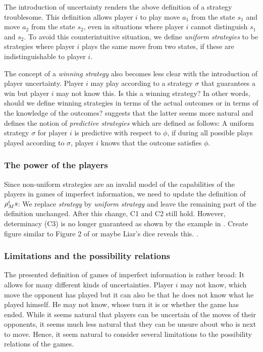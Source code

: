 The introduction of uncertainty renders the above definition of a strategy troublesome. This definition allows player $ i $ to play move $ a_{1} $ from the state $ s_{1} $ and move $ a_{2} $ from the state $ s_{2} $, even in situations where player $ i $ cannot distinguish $ s_{1} $ and $ s_{2} $. To avoid this counterintuitive situation, we define \emph{uniform strategies} to be strategies where player $ i $ plays the same move from two states, if these are indistinguishable to player $ i $.

The concept of a \emph{winning strategy} also becomes less clear with the introduction of player uncertainty. Player $ i $ may play according to a strategy $ \sigma $ that guarantees a win but player $ i $ may not know this. Is this a winning strategy? In other words, should we define winning strategies in terms of the actual outcomes or in terms of the knowledge of the outcomes? \cite{benthem2001a} suggests that the latter seems more natural and defines the notion of \emph{predictive strategies} which are defined as follows: A uniform strategy $ \sigma $ for player $ i $ is predictive with respect to $ \phi $, if during all possible plays played according to $ \sigma $, player $ i $ knows that the outcome satisfies $ \phi $.

\subsubsection*{The power of the players}

Since non-uniform strategies are an invalid model of the capabilities of the players in games of imperfect information, we need to update the definition of $ \rho_{M}^{ i } s $: We replace \emph{strategy} by \emph{uniform strategy} and leave the remaining part of the definition unchanged. After this change, C1 and C2 still hold. However, determinacy (C3) is no longer guaranteed as shown by the example in . { \color{red} Create figure similar to Figure 2 of \cite{benthem2001a} or maybe Liar's dice reveals this. }.

\subsubsection*{Limitations and the possibility relations}

The presented definition of games of imperfect information is rather broad: It allows for many different kinds of uncertainties. Player $ i $ may not know, which move the opponent has played but it can also be that he does not know what he played himself. He may not know, whose turn it is or whether the game has ended. While it seems natural that players can be uncertain of the moves of their opponents, it seems much less natural that they can be unsure about who is next to move. Hence, it seem natural to consider several limitations to the possibility relations of the games.


